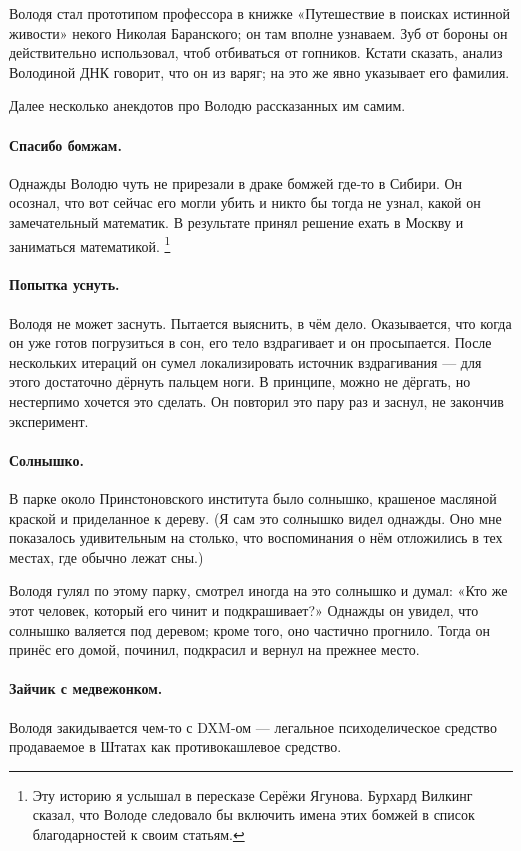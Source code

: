 \documentclass{book}
\begin{document}
Володя стал прототипом профессора в книжке «Путешествие в поисках истинной живости» некого Николая Баранского; он там вполне узнаваем.
Зуб от бороны он действительно использовал, чтоб отбиваться от гопников.
Кстати сказать, анализ Володиной ДНК говорит, что он из варяг;
на это же явно указывает его фамилия.

Далее несколько анекдотов про Володю рассказанных им самим.

\paragraph{Спасибо бомжам.}
Однажды Володю чуть не прирезали в драке бомжей где-то в Сибири.
Он осознал, что вот сейчас его могли убить и никто бы тогда не узнал, какой он замечательный математик.
В результате принял решение ехать в Москву и заниматься математикой.%
\footnote{Эту историю я услышал в пересказе Серёжи Ягунова.
Бурхард Вилкинг сказал, что Володе следовало бы включить имена этих бомжей в список благодарностей к своим статьям.}


\paragraph{Попытка уснуть.}
Володя не может заснуть.
Пытается выяснить, в чём дело.
Оказывается, что когда он уже готов погрузиться в сон, его тело вздрагивает и он просыпается.
После нескольких итераций он сумел локализировать источник вздрагивания --- для этого достаточно дёрнуть пальцем ноги.
В принципе, можно не дёргать, но нестерпимо хочется это сделать.
Он повторил это пару раз и заснул, не закончив эксперимент.

\paragraph{Солнышко.}
В парке около Принстоновского института было солнышко, крашеное масляной краской и приделанное к дереву.
(Я сам это солнышко видел однажды.
Оно мне показалось удивительным на столько, что воспоминания о нём отложились в тех местах, где обычно лежат сны.)

Володя гулял по этому парку, смотрел иногда на это солнышко и думал: «Кто же этот человек, который его чинит и подкрашивает?»
Однажды он увидел, что солнышко валяется под деревом;
кроме того, оно частично прогнило.
Тогда он принёс его домой, починил, подкрасил и вернул на прежнее место.

\paragraph{Зайчик с медвежонком.}
Володя закидывается чем-то с DXM-ом --- легальное психоделическое средство продаваемое в Штатах как противокашлевое средство.
\end{document}
